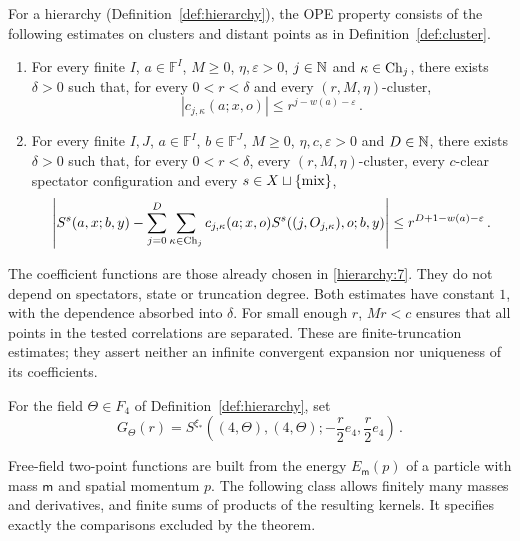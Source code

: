 \begin{definition}\label{def:ope}
For a hierarchy (Definition~\ref{def:hierarchy}), the OPE property consists of the following estimates on clusters and distant points as in Definition~\ref{def:cluster}.
\begin{enumerate}[label=\textup{O\arabic*.},ref=O\arabic*]
\item\label{ope:1} For every finite $I$, $a\in\mathbb F^I$, $M\ge0$, $\eta,\varepsilon>0$, $j\in\mathbb N$ and $\kappa\in\operatorname{Ch}_{j}$, there exists $\delta>0$ such that, for every $0<r<\delta$ and every $(r,M,\eta)$-cluster,
\begin{equation}\label{eq:ope-coefficient}
|c_{j,\kappa}(a;x,o)|\le r^{j-w(a)-\varepsilon}\,.
\end{equation}
\item\label{ope:2} For every finite $I,J$, $a\in\mathbb F^I$, $b\in\mathbb F^J$, $M\ge0$, $\eta,c,\varepsilon>0$ and $D\in\mathbb N$, there exists $\delta>0$ such that, for every $0<r<\delta$, every $(r,M,\eta)$-cluster, every $c$-clear spectator configuration and every $s\in X\sqcup\{\mathrm{mix}\}$,
\begin{equation}\label{eq:ope-remainder}
\left|S^s(a,x;b,y)-\sum_{j=0}^D\sum_{\kappa\in\operatorname{Ch}_{j}}
 c_{j,\kappa}(a;x,o)S^s((j,O_{j,\kappa}),o;b,y)\right|\le r^{D+1-w(a)-\varepsilon}\,.
\end{equation}
\end{enumerate}
\end{definition}

The coefficient functions are those already chosen in \ref{hierarchy:7}.
They do not depend on spectators, state or truncation degree.
Both estimates have constant $1$, with the dependence absorbed into $\delta$.
For small enough $r$, $Mr<c$ ensures that all points in the tested correlations are separated.
These are finite-truncation estimates; they assert neither an infinite convergent expansion nor uniqueness of its coefficients.

\begin{definition}\label{def:trace-pair}
For the field $\Theta\in F_4$ of Definition~\ref{def:hierarchy}, set
\begin{equation}\label{eq:trace-pair}
G_\Theta(r)=S^{\xi_*}((4,\Theta),(4,\Theta);-\frac{r}{2}e_4,\frac{r}{2}e_4)\,.
\end{equation}
\end{definition}

Free-field two-point functions are built from the energy $E_{\mathsf m}(p)$ of a particle with mass $\mathsf m$ and spatial momentum $p$.
The following class allows finitely many masses and derivatives, and finite sums of products of the resulting kernels.
It specifies exactly the comparisons excluded by the theorem.

